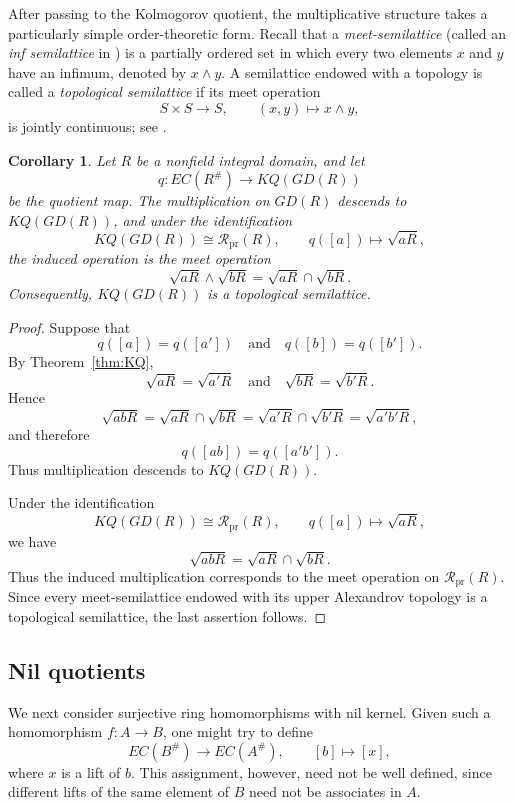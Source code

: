 \documentclass[11pt]{amsart}
\theoremstyle{plain}
\newtheorem{corollary}[theorem]{Corollary}
\theoremstyle{definition}
\theoremstyle{remark}
\numberwithin{equation}{section}
\begin{document}
After passing to the Kolmogorov quotient, the multiplicative structure
takes a particularly simple order-theoretic form. Recall that a \emph{meet-semilattice} (called an \emph{inf
	semilattice} in \cite[Definition~O-1.8]{GierzEtAl}) is a partially
ordered set in which every two elements $x$ and $y$ have an infimum,
denoted by $x\wedge y$. A semilattice endowed with a topology is
called a \emph{topological semilattice} if its meet operation
\[
S\times S\longrightarrow S,
\qquad
(x,y)\longmapsto x\wedge y,
\]
is jointly continuous; see
\cite[Definition~VI-1.11]{GierzEtAl}.

\begin{corollary}\label{cor:radical-semilattice}
	Let $R$ be a nonfield integral domain, and let
	\[
	q:EC(R^\#)\longrightarrow KQ(GD(R))
	\]
	be the quotient map. The multiplication on $GD(R)$ descends to
	$KQ(GD(R))$, and under the identification
	\[
	KQ(GD(R))\cong\mathcal R_{\mathrm{pr}}(R),
	\qquad
	q([a])\longmapsto\sqrt{aR},
	\]
	the induced operation is the meet operation
	\[
	\sqrt{aR}\wedge\sqrt{bR}
	=
	\sqrt{aR}\cap\sqrt{bR}.
	\]
	Consequently, $KQ(GD(R))$ is a topological semilattice.
\end{corollary}

\begin{proof}
	Suppose that
	\[
	q([a])=q([a'])
	\quad\text{and}\quad
	q([b])=q([b']).
	\]
	By Theorem~\ref{thm:KQ},
	\[
	\sqrt{aR}=\sqrt{a'R}
	\quad\text{and}\quad
	\sqrt{bR}=\sqrt{b'R}.
	\]
	Hence
	\[
	\sqrt{abR}
	=
	\sqrt{aR}\cap\sqrt{bR}
	=
	\sqrt{a'R}\cap\sqrt{b'R}
	=
	\sqrt{a'b'R},
	\]
	and therefore
	\[
	q([ab])=q([a'b']).
	\]
	Thus multiplication descends to $KQ(GD(R))$.
	
	Under the identification
	\[
	KQ(GD(R))\cong\mathcal R_{\mathrm{pr}}(R),
	\qquad
	q([a])\longmapsto\sqrt{aR},
	\]
	we have
	\[
	\sqrt{abR}
	=
	\sqrt{aR}\cap\sqrt{bR}.
	\]
	Thus the induced multiplication corresponds to the meet operation on
	$\mathcal R_{\mathrm{pr}}(R)$. Since every meet-semilattice endowed
	with its upper Alexandrov topology is a topological semilattice, the
	last assertion follows.
\end{proof}


\subsection{Nil quotients}

We next consider surjective ring homomorphisms with nil kernel.
Given such a homomorphism $f:A\to B$, one might try to define
\[
EC(B^\#)\longrightarrow EC(A^\#),\qquad
[b]\longmapsto [x],
\]
where $x$ is a lift of $b$. This assignment, however, need not be
well defined, since different lifts of the same element of $B$ need
not be associates in $A$.
\end{document}
